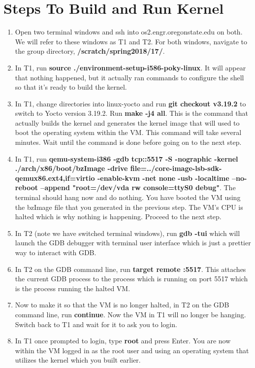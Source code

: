 \documentclass[onecolumn,draftclsnofoot, 10pt, compsoc]{IEEEtran}
\begin{document}
\section{Steps To Build and Run Kernel}
	\begin{enumerate}
		\item
			Open two terminal windows and ssh into os2.engr.oregonstate.edu on both. 
			We will refer to these windows as T1 and T2. 
			For both windows, navigate to the group directory, \textbf{/scratch/spring2018/17/}.	
		\item
			In T1, run \textbf{source ./environment-setup-i586-poky-linux}. 
			It will appear that nothing happened, but it actually ran commands to configure the shell so that it’s ready to build the kernel. 
		\item
			In T1, change directories into linux-yocto and run \textbf{git checkout v3.19.2} to switch to Yocto version 3.19.2.
			Run \textbf{make -j4 all}. 
			This is the command that actually builds the kernel and generates the kernel image that will used to boot the operating system within the VM. 
			This command will take several minutes. 
			Wait until the command is done before going on to the next step.
		\item
			In T1, run 
			\textbf{qemu-system-i386 -gdb tcp::5517 -S -nographic -kernel ./arch/x86/boot/bzImage -drive file=../core-image-lsb-sdk-qemux86.ext4,if=virtio -enable-kvm -net none -usb -localtime --no-reboot --append "root=/dev/vda rw console=ttyS0 debug"}. 
			The terminal should hang now and do nothing. 
			You have booted the VM using the bzImage file that you generated in the previous step. 
			The VM’s CPU is halted which is why nothing is happening. 
			Proceed to the next step.	
		\item
			In T2 (note we have switched terminal windows), run \textbf{gdb -tui} which will launch the GDB debugger with terminal user interface which is just a prettier way to interact with GDB.
		\item
			In T2 on the GDB command line, run \textbf{target remote :5517}. 
			This attaches the current GDB process to the process which is running on port 5517 which is the process running the halted VM.
		\item
			Now to make it so that the VM is no longer halted, in T2 on the GDB command line, run \textbf{continue}. 
			Now the VM in T1 will no longer be hanging. 
			Switch back to T1 and wait for it to ask you to login.
		\item
			In T1 once prompted to login, type \textbf{root} and press Enter. 
			You are now within the VM logged in as the root user and using an operating system that utilizes the kernel which you built earlier. 
	\end{enumerate}
\end{document}
